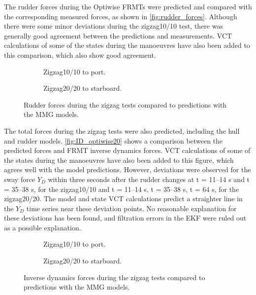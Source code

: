 The rudder forces during the Optiwise FRMTs were predicted and compared with the corresponding measured forces, as shown in \autoref{fig:rudder_forces}. Although there were some minor deviations during the zigzag10/10 test, there was generally good agreement between the predictions and measurements. VCT calculations of some of the states during the manoeuvres have also been added to this comparison, which also show good agreement.
\begin{figure}[h]
    \centering
    \begin{subfigure}[b]{0.49\textwidth}
        \centering
        
        \caption{Zigzag10/10 to port.}
        \label{fig:ID_measured_rudder_zigzag_10_10}
    \end{subfigure}
     \hfill
    \begin{subfigure}[b]{0.49\textwidth}
        \centering
        
        \caption{Zigzag20/20 to starboard.}
        \label{fig:ID_measured_rudder_zigzag_20_20}
    \end{subfigure}
    \caption{Rudder forces during the zigzag tests compared to predictions with the MMG models.}
    \label{fig:rudder_forces}
\end{figure}

The total forces during the zigzag tests were also predicted, including the hull and rudder models. \autoref{fig:ID_optiwise20}  shows a comparison between the predicted forces and FRMT inverse dynamics forces. VCT calculations of some of the states during the manoeuvres have also been added to this figure, which agrees well with the model predictions.
However, deviations were observed for the sway force $Y_D$ within three seconds after the rudder changes at t = 11--14 s and t = 35--38 s, for the zigzag10/10 and t = 11--14 s, t = 35--38 s, t = 64 s, for the zigzag20/20. The model and state VCT calculations predict a straighter line in the $Y_D$ time series near these deviation points. No reasonable explanation for these deviations has been found, and filtration errors in the EKF were ruled out as a possible explanation.
\begin{figure}[h]
    \centering
    \begin{subfigure}[b]{\textwidth}
        \centering
        
        \caption{Zigzag10/10 to port.}
        \label{fig:ID_MMG_zigzag_10_10}
    \end{subfigure}
     \vfill
    \begin{subfigure}[b]{\textwidth}
        \centering
        
        \caption{Zigzag20/20 to starboard.}
        \label{fig:ID_MMG_zigzag_20_20}
    \end{subfigure}
    \caption{Inverse dynamics forces during the zigzag tests compared to predictions with the MMG models.}
    \label{fig:ID_optiwise20}
\end{figure}

